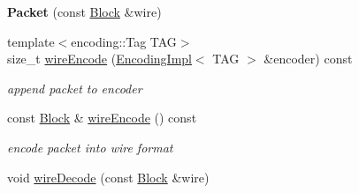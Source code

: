 \begin{DoxyCompactItemize}
\item 
{\bfseries Packet} (const \hyperlink{classndn_1_1Block}{Block} \&wire)\hypertarget{classndn_1_1lp_1_1Packet_a78fc3a0f78ba888f4ddf400457428a22}{}\label{classndn_1_1lp_1_1Packet_a78fc3a0f78ba888f4ddf400457428a22}

\item 
{\footnotesize template$<$encoding\+::\+Tag T\+AG$>$ }\\size\+\_\+t \hyperlink{classndn_1_1lp_1_1Packet_a7813b7be4a4cac4bbf9ecb2aec01c7f1}{wire\+Encode} (\hyperlink{classndn_1_1encoding_1_1EncodingImpl}{Encoding\+Impl}$<$ T\+AG $>$ \&encoder) const\hypertarget{classndn_1_1lp_1_1Packet_a7813b7be4a4cac4bbf9ecb2aec01c7f1}{}\label{classndn_1_1lp_1_1Packet_a7813b7be4a4cac4bbf9ecb2aec01c7f1}

\begin{DoxyCompactList}\small\item\em append packet to encoder \end{DoxyCompactList}\item 
const \hyperlink{classndn_1_1Block}{Block} \& \hyperlink{classndn_1_1lp_1_1Packet_ad55d1ba34619e686efc2fb1f5fd2855b}{wire\+Encode} () const\hypertarget{classndn_1_1lp_1_1Packet_ad55d1ba34619e686efc2fb1f5fd2855b}{}\label{classndn_1_1lp_1_1Packet_ad55d1ba34619e686efc2fb1f5fd2855b}

\begin{DoxyCompactList}\small\item\em encode packet into wire format \end{DoxyCompactList}\item 
void \hyperlink{classndn_1_1lp_1_1Packet_af24398dc7941f4a2864215ef360a8a5c}{wire\+Decode} (const \hyperlink{classndn_1_1Block}{Block} \&wire)\hypertarget{classndn_1_1lp_1_1Packet_af24398dc7941f4a2864215ef360a8a5c}{}\label{classndn_1_1lp_1_1Packet_af24398dc7941f4a2864215ef360a8a5c}


\end{DoxyCompactItemize}
